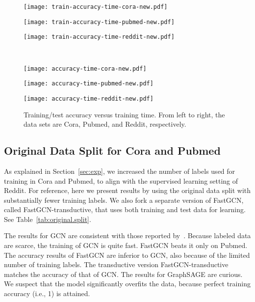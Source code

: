 \documentclass{article} \usepackage{iclr2018_conference,times}
\theoremstyle{plain}\newtheorem{theorem}{Theorem}\theoremstyle{plain}\newtheorem{proposition}[theorem]{Proposition}
\theoremstyle{plain}\newtheorem{corollary}[theorem]{Corollary}
\theoremstyle{plain}\newtheorem{lemma}[theorem]{Lemma}
\begin{document}
\begin{figure}[ht]
\centering
\begin{minipage}{0.33\linewidth}
\centering
\texttt{[image: train-accuracy-time-cora-new.pdf]}
\end{minipage}\begin{minipage}{0.33\linewidth}
\centering
\texttt{[image: train-accuracy-time-pubmed-new.pdf]}
\end{minipage}\begin{minipage}{0.33\linewidth}
\centering
\texttt{[image: train-accuracy-time-reddit-new.pdf]}
\end{minipage}\\
\centering
\begin{minipage}{0.33\linewidth}
\centering
\texttt{[image: accuracy-time-cora-new.pdf]}
\end{minipage}\begin{minipage}{0.33\linewidth}
\centering
\texttt{[image: accuracy-time-pubmed-new.pdf]}
\end{minipage}\begin{minipage}{0.33\linewidth}
\centering
\texttt{[image: accuracy-time-reddit-new.pdf]}
\end{minipage}\caption{Training/test accuracy versus training time. From left to right, the data sets are Cora, Pubmed, and Reddit, respectively.}
\label{fig:accuracy.vs.time}
\end{figure}



\subsection{Original Data Split for Cora and Pubmed}

As explained in Section~\ref{sec:exp}, we increased the number of labels used for training in Cora and Pubmed, to align with the supervised learning setting of Reddit. For reference, here we present results by using the original data split with substantially fewer training labels. We also fork a separate version of FastGCN, called FastGCN-transductive, that uses both training and test data for learning. See Table~\ref{tab:original.split}.

The results for GCN are consistent with those reported by~\cite{DBLP:journals/corr/KipfW16}. Because labeled data are scarce, the training of GCN is quite fast. FastGCN beats it only on Pubmed. The accuracy results of FastGCN are inferior to GCN, also because of the limited number of training labels. The transductive version FastGCN-transductive matches the accuracy of that of GCN. The results for GraphSAGE are curious. We suspect that the model significantly overfits the data, because perfect training accuracy (i.e., 1) is attained.
\end{document}
